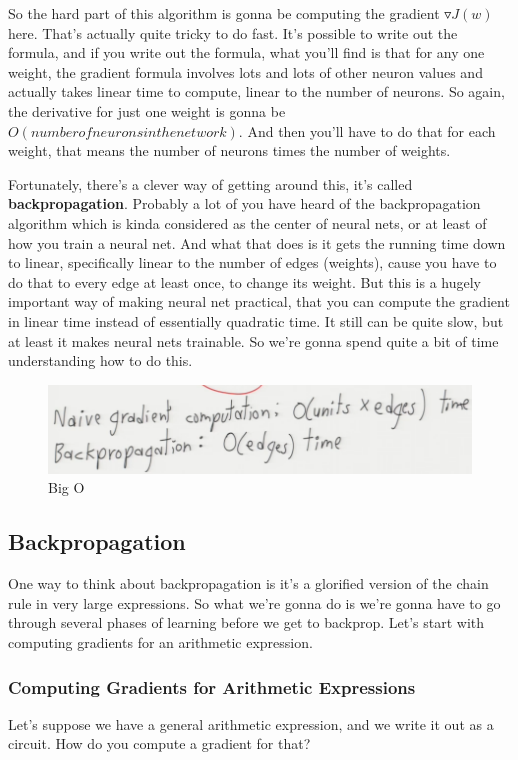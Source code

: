 \documentclass[fleqn,10pt]{olplainarticle}
\theoremstyle{definition}
\theoremstyle{remark}
\begin{document}
So the hard part of this algorithm is gonna be computing the gradient $\triangledown J(w)$ here. That's actually quite tricky to do fast. It's possible to write out the formula, and if you write out the formula, what you'll find is that for any one weight, the gradient formula involves lots and lots of other neuron values and actually takes linear time to compute, linear to the number of neurons. So again, the derivative for just one weight is gonna be $O(number of neurons in the network)$. And then you'll have to do that for each weight, that means the number of neurons times the number of weights.

Fortunately, there's a clever way of getting around this, it's called \textbf{backpropagation}. Probably a lot of you have heard of the backpropagation algorithm which is kinda considered as the center of neural nets, or at least of how you train a neural net. And what that does is it gets the running time down to linear, specifically linear to the number of edges (weights), cause you have to do that to every edge at least once, to change its weight. But this is a hugely important way of making neural net practical, that you can compute the gradient in linear time instead of essentially quadratic time. It still can be quite slow, but at least it makes neural nets trainable. So we're gonna spend quite a bit of time understanding how to do this.
\begin{figure}[ht]
\centering
\includegraphics[width=0.5\linewidth]{images/big_o_gradient_descent}
\caption{Big O}
\label{fig:big_o_gradient_descent}
\end{figure}

\subsection*{Backpropagation}
One way to think about backpropagation is it's a glorified version of the chain rule in very large expressions. So what we're gonna do is we're gonna have to go through several phases of learning before we get to backprop. Let's start with computing gradients for an arithmetic expression.

\subsubsection*{Computing Gradients for Arithmetic Expressions}
Let's suppose we have a general arithmetic expression, and we write it out as a circuit. How do you compute a gradient for that?
\end{document}

